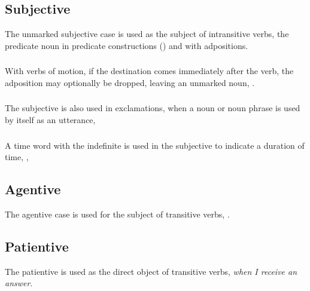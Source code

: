 \subsection{Subjective} The unmarked subjective case is used as the
subject of intransitive verbs, the predicate noun in predicate
constructions () and with
adpositions. 

\subsubsection{} With verbs of motion, if the destination comes
immediately after the verb, the ad\-posi\-tion  may optionally be
dropped, leaving an unmarked noun,  . \label{syn:subjective:ne}

\subsubsection{} The subjective is also used in exclamations, when a
noun or noun phrase is used by itself as an utterance,  
 

\subsubsection{} A time word with the indefinite  is used in the
subjective to indicate a duration of time,  ,  

\subsection{Agentive} The agentive case is used for the subject of
transitive verbs,  .

\subsection{Patientive} The patientive is used as the direct object of
transitive verbs, 
\textit{when I receive an answer}.

